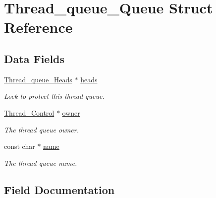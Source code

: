 \hypertarget{structThread__queue__Queue}{}\section{Thread\+\_\+queue\+\_\+\+Queue Struct Reference}
\label{structThread__queue__Queue}
\subsection*{Data Fields}
\begin{DoxyCompactItemize}
\item 
\mbox{\hyperlink{group__RTEMSScoreThreadQueue_gaebac32033b009cc8f606a90bd389f8e9}{Thread\+\_\+queue\+\_\+\+Heads}} $\ast$ \mbox{\hyperlink{structThread__queue__Queue_abbac66736a3f2fdec789b832c7386243}{heads}}
\begin{DoxyCompactList}\small\item\em Lock to protect this thread queue. \end{DoxyCompactList}\item 
\mbox{\label{structThread__queue__Queue_ac18d7e7be5de7a160653a114cd15db00}} 
\mbox{\hyperlink{struct__Thread__Control}{Thread\+\_\+\+Control}} $\ast$ \mbox{\hyperlink{structThread__queue__Queue_ac18d7e7be5de7a160653a114cd15db00}{owner}}
\begin{DoxyCompactList}\small\item\em The thread queue owner. \end{DoxyCompactList}\item 
\mbox{\label{structThread__queue__Queue_a0690180d8de2cb3e7a7bbff14cfd5a6e}} 
const char $\ast$ \mbox{\hyperlink{structThread__queue__Queue_a0690180d8de2cb3e7a7bbff14cfd5a6e}{name}}
\begin{DoxyCompactList}\small\item\em The thread queue name. \end{DoxyCompactList}\end{DoxyCompactItemize}


\subsection{Field Documentation}
\mbox{\label{structThread__queue__Queue_abbac66736a3f2fdec789b832c7386243}} 
